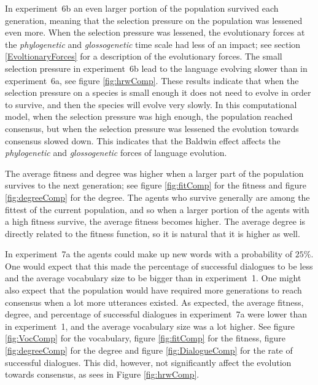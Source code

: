 In experiment~6b an even larger portion of the population survived each generation, meaning that the selection pressure on the population was lessened even more. When the selection pressure was lessened, the evolutionary forces at the \textit{phylogenetic} and \textit{glossogenetic} time scale had less of an impact; see section \ref{EvoltionaryForces} for a description of the evolutionary forces. The small selection pressure in experiment~6b lead to the language evolving slower than in experiment~6a, see figure \ref{fig:hrwComp}. These results indicate that when the selection pressure on a species is small enough it does not need to evolve in order to survive, and then the species will evolve very slowly. In this computational model, when the selection pressure was high enough, the population reached consensus, but when the selection pressure was lessened the evolution towards consensus slowed down. This indicates that the Baldwin effect affects the \textit{phylogenetic} and \textit{glossogenetic} forces of language evolution. 

The average fitness and degree was higher when a larger part of the population survives to the next generation; see figure \ref{fig:fitComp} for the fitness and figure \ref{fig:degreeComp} for the degree. The agents who survive generally are among the fittest of the current population, and so when a larger portion of the agents with a high fitness survive, the average fitness becomes higher. The average degree is directly related to the fitness function, so it is natural that it is higher as well. 

In experiment~7a the agents could make up new words with a probability of $25\%$. One would expect that this made the percentage of successful dialogues to be less and the average vocabulary size to be bigger than in experiment~1. One might also expect that the population would have required more generations to reach consensus when a lot more utterances existed. As expected, the average fitness, degree, and percentage of successful dialogues in experiment~7a were lower than in experiment~1, and the average vocabulary size was a lot higher. See figure \ref{fig:VocComp} for the vocabulary, figure \ref{fig:fitComp} for the fitness, figure \ref{fig:degreeComp} for the degree and figure \ref{fig:DialogueComp} for the rate of successful dialogues. This did, however, not significantly affect the evolution towards consensus, as sees in Figure \ref{fig:hrwComp}. 

